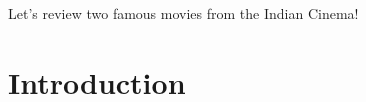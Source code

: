 \documentclass{article}
\begin{document}
Let's review two famous movies from the Indian Cinema!


\section{Introduction}
\end{document}
